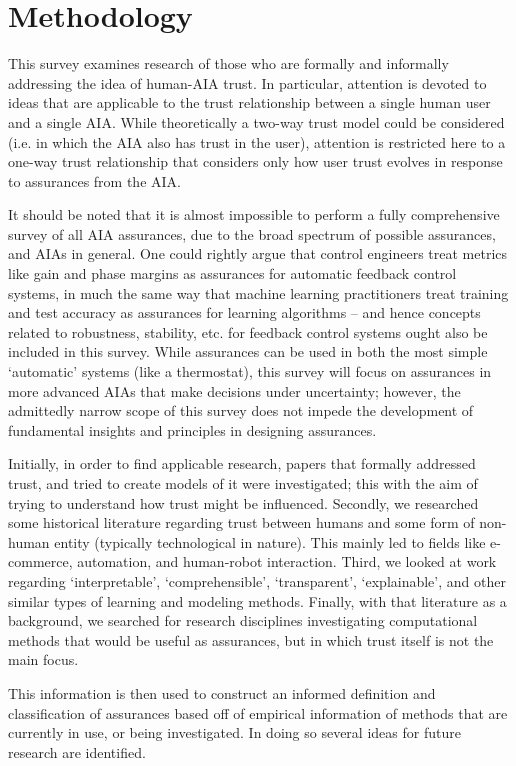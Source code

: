 \section{Methodology} \label{sec:methodology}
    This survey examines research of those who are formally and informally addressing the idea of human-AIA trust. In particular, attention is devoted to ideas that are applicable to the trust relationship between a single human user and a single AIA. While theoretically a two-way trust model could be considered (i.e. in which the AIA also has trust in the user), attention is restricted here to a one-way trust relationship that considers only how user trust evolves in response to assurances from the AIA. 

    It should be noted that it is almost impossible to perform a fully comprehensive survey of all AIA assurances, due to the broad spectrum of possible assurances, and AIAs in general. One could rightly argue that control engineers treat metrics like gain and phase margins as assurances for automatic feedback control systems, in much the same way that  machine learning practitioners treat training and test accuracy as assurances for learning algorithms -- and hence concepts related to robustness, stability, etc. for feedback control systems ought also be included in this survey. While assurances can be used in both the most simple `automatic' systems (like a thermostat), this survey will focus on assurances in more advanced AIAs that make decisions under uncertainty; however, the admittedly narrow scope of this survey does not impede the development of fundamental insights and principles in designing assurances.

    Initially, in order to find applicable research, papers that formally addressed trust, and tried to create models of it were investigated; this with the aim of trying to understand how trust might be influenced. Secondly, we researched some historical literature regarding trust between humans and some form of non-human entity (typically technological in nature). This mainly led to fields like e-commerce, automation, and human-robot interaction. Third, we looked at work regarding `interpretable', `comprehensible', `transparent', `explainable', and other similar types of learning and modeling methods. Finally, with that literature as a background, we searched for research disciplines investigating computational methods that would be useful as assurances, but in which trust itself is not the main focus.

    This information is then used to construct an informed definition and classification of assurances based off of empirical information of methods that are currently in use, or being investigated. In doing so several ideas for future research are identified.

